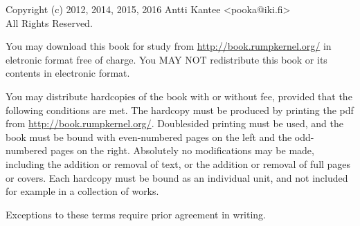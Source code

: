 \documentclass[openright]{tkkdiss}
\begin{document}


\cleardoublepage

Copyright (c) 2012, 2014, 2015, 2016 Antti Kantee <pooka@iki.fi> \\
All Rights Reserved.

You may download this book for study from
\url{http://book.rumpkernel.org/} in eletronic format free of charge.
You MAY NOT redistribute this book or its contents in electronic format.

You may distribute hardcopies of the book with or without fee, provided
that the following conditions are met.  The hardcopy must be produced
by printing the pdf from \url{http://book.rumpkernel.org/}.
Doublesided printing must be used, and the book must be bound with even-numbered
pages on the left and the odd-numbered pages on the right.
Absolutely no modifications may be made, including the addition or
removal of text, or the addition or removal of full pages or covers.
Each hardcopy must be bound as an individual unit, and not included for
example in a collection of works.

Exceptions to these terms require prior agreement in writing.



\end{document}

